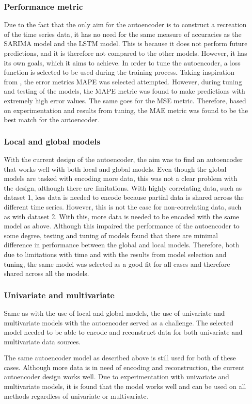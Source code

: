 \subsubsection{Performance metric}
Due to the fact that the only aim for the autoencoder is to construct a recreation of the time series data,
it has no need for the same measure of accuracies as the SARIMA model and the LSTM model.
This is because it does not perform future predictions, and it is therefore not compared to the other models.
However, it has its own goals, which it aims to achieve.
In order to tune the autoencoder, a loss function is selected to be used during the training process.
Taking inspiration from \cite{Zhao2019}, the error metrics MAPE was selected attempted.
However, during tuning and testing of the models, the MAPE metric was found to make predictions with extremely high error values.
The same goes for the MSE metric.
Therefore, based on experimentation and results from tuning,
the MAE metric was found to be the best match for the autoencoder.


\subsubsection{Local and global models}
With the current design of the autoencoder, the aim was to find an autoencoder that works well with both local and global models.
Even though the global models are tasked with encoding more data, this was not a clear problem with the design, although there are limitations.
With highly correlating data, such as dataset 1, less data is needed to encode because partial data is shared across the different time series.
However, this is not the case for non-correlating data, such as with dataset 2.
With this, more data is needed to be encoded with the same model as above.
Although this impaired the performance of the autoencoder to some degree, testing and tuning of models found that there are minimal difference in performance between the global and local models.
Therefore, both due to limitations with time and with the results from model selection and tuning,
the same model was selected as a good fit for all cases and therefore shared across all the models.

\subsubsection{Univariate and multivariate}
Same as with the use of local and global models,
the use of univariate and multivariate models with the autoencoder served as a challenge.
The selected model needed to be able to encode and reconstruct data for both univariate and multivariate data sources.

The same autoencoder model as described above is still used for both of these cases.
Although more data is in need of encoding and reconstruction,
the current autoencoder design works well.
Due to experimentation with univariate and multivariate models,
it is found that the model works well and can be used on all methods regardless of univariate or multivariate.




